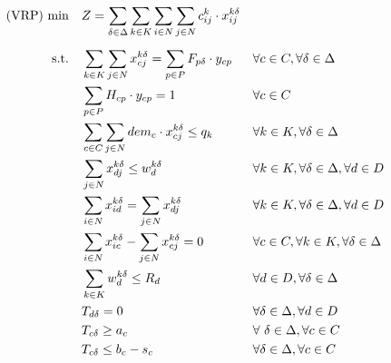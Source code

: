 \documentclass[preprint,review,12pt]{elsarticle}
\begin{document}
\begin{align}
	\text{(VRP) min} \quad      & Z = \sum\limits_{\delta\in \Delta} \sum\limits_{k\in K}\sum\limits_{i\in N}\sum\limits_{j\in N} c_{ij}^k \cdot x_{ij}^{k\delta}    && \label{PCVRP_FObj}    \\[5pt]
	\noindent \text{s.t.} \quad & \sum\limits_{k \in K}\sum\limits_{j \in N} x_{cj}^{k\delta} = \sum\limits_{p \in P} F_{p\delta} \cdot y_{cp}    && \text{\hspace{-0cm}} \forall c \in C, \forall \delta \in \Delta \label{PCVRP_Service} \\
	& \sum\limits_{p \in P} H_{cp} \cdot y_{cp} = 1                 && \text{\hspace{-0cm}} \forall c \in C  \label{PCVRP_Freq} \\
	& \sum\limits_{c \in C}\sum\limits_{j \in N}dem_{c} \cdot x_{cj}^{k\delta} \leq q_k                 && \text{\hspace{-0cm}} \forall k \in K, \forall \delta \in \Delta  \label{PCVRP_Capacity} \\
	& \sum\limits_{j \in N}x_{dj}^{k\delta} \leq w_d^{k\delta} && \text{\hspace{-0cm}} \forall k \in K, \forall \delta \in \Delta, \forall d \in D \label{PCVRP_StartRoute} \\
	& \sum\limits_{i \in N}x_{id}^{k\delta} =    \sum\limits_{j \in N}x_{dj}^{k\delta} && \text{\hspace{-0cm}} \forall k \in K, \forall \delta \in \Delta, \forall d \in D \label{PCVRP_EndRoute} \\
	& \sum\limits_{i \in N}x_{ic}^{k\delta} - \sum\limits_{j \in N}x_{cj}^{k\delta} = 0             && \text{\hspace{-0cm}} \forall c \in C, \forall k \in K, \forall \delta \in \Delta \label{PCVRP_Balance} \\
	& \sum\limits_{k \in K}w_d^{k\delta} \leq R_d && \text{\hspace{-0cm}} \forall d \in D, \forall \delta \in \Delta \label{PCVRP_CapacityD} \\
	& T_{d\delta} = 0  && \text{\hspace{-0cm}} \forall \delta \in \Delta, \forall d \in D \label{PCVRP_InitialT}\\
	& T_{c\delta} \geq a_c  && \text{\hspace{-0cm}} \forall \ \delta \in \Delta, \forall c \in C \label{PCVRP_ArriveT}\\
	& T_{c\delta} \leq b_c - s_c && \text{\hspace{-0cm}} \forall \delta \in \Delta, \forall c \in C \label{PCVRP_DepartT}
\end{align}
\end{document}
